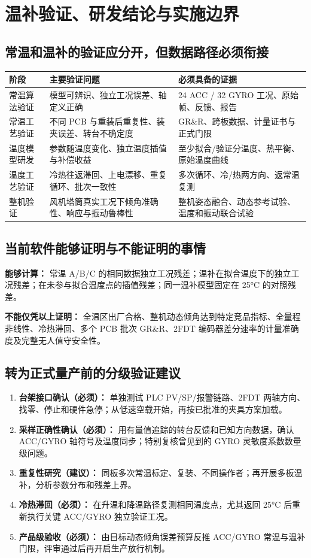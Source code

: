 \chapter{温补验证、研发结论与实施边界}
\section{常温和温补的验证应分开，但数据路径必须衔接}
\noindent\begin{tabularx}{\linewidth}{@{}p{34mm}YY@{}}\toprule
阶段 & 主要验证问题 & 必须具备的证据\\\midrule
常温算法验证 & 模型可辨识、独立工况误差、轴定义正确 & 24 ACC / 32 GYRO 工况、原始帧、反馈、报告\\
常温工艺验证 & 不同 PCB 与重装后重复性、装夹误差、转台不确定度 & GR\&R、跨板数据、计量证书与正式门限\\
温度模型研发 & 参数随温度变化、独立温度插值与补偿收益 & 至少拟合/验证分温度、热平衡、原始温度曲线\\
温度工艺验证 & 冷热往返滞回、上电漂移、重复循环、批次一致性 & 多次循环、冷/热两方向、返常温复测\\
整机验证 & 风机塔筒真实工况下倾角准确性、响应与振动鲁棒性 & 整机姿态融合、动态参考试验、温度和振动联合试验\\\bottomrule\end{tabularx}

\section{当前软件能够证明与不能证明的事情}
\textbf{能够计算：} 常温 A/B/C 的相同数据独立工况残差；温补在拟合温度下的独立工况残差；在未参与拟合温度点的插值残差；同一温补模型固定在 25°C 的对照残差。\par
\textbf{不能仅凭以上证明：} 全温区出厂合格、整机动态倾角达到特定竞品指标、全量程非线性、冷热滞回、多个 PCB 批次 GR\&R、2FDT 编码器差分速率的计量准确度及完整无人值守安全性。

\section{转为正式量产前的分级验证建议}
\begin{enumerate}
\item \textbf{台架接口确认（必须）：} 单独测试 PLC PV/SP/报警链路、2FDT 两轴方向、找零、停止和硬件急停；从低速空载开始，再按已批准的夹具方案加载。
\item \textbf{采样正确性确认（必须）：} 用有量值追踪的转台反馈和已知方向数据，确认 ACC/GYRO 轴符号及温度同步；特别复核曾见到的 GYRO 灵敏度系数数量级问题。
\item \textbf{重复性研究（建议）：} 同板多次常温标定、复装、不同操作者；再开展多板温补，分析参数分布和残差上界。
\item \textbf{冷热滞回（必须）：} 在升温和降温路径复测相同温度点，尤其返回 25°C 后重新执行关键 ACC/GYRO 独立验证工况。
\item \textbf{产品级验收（必须）：} 由目标动态倾角误差预算反推 ACC/GYRO 常温与温补门限，评审通过后再开启生产放行机制。
\end{enumerate}

